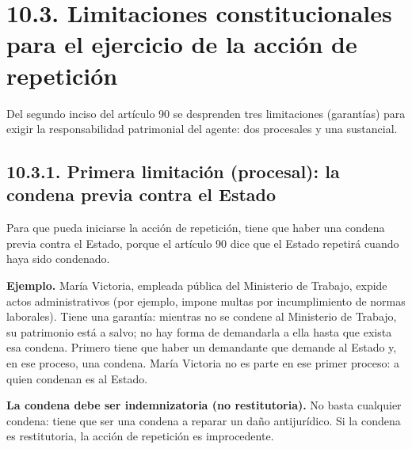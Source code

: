 \section{10.3. Limitaciones constitucionales para el ejercicio de la acción de repetición}
Del segundo inciso del artículo 90 se desprenden tres limitaciones (garantías) para exigir la responsabilidad patrimonial del agente: dos procesales y una sustancial.

\subsection{10.3.1. Primera limitación (procesal): la condena previa contra el Estado}
Para que pueda iniciarse la acción de repetición, tiene que haber una condena previa contra el Estado, porque el artículo 90 dice que el Estado repetirá cuando haya sido condenado.

\begin{ejemplo}
\textcolor[HTML]{4F6228}{\textbf{Ejemplo. }}María Victoria, empleada pública del Ministerio de Trabajo, expide actos administrativos (por ejemplo, impone multas por incumplimiento de normas laborales). Tiene una garantía: mientras no se condene al Ministerio de Trabajo, su patrimonio está a salvo; no hay forma de demandarla a ella hasta que exista esa condena. Primero tiene que haber un demandante que demande al Estado y, en ese proceso, una condena. María Victoria no es parte en ese primer proceso: a quien condenan es al Estado.
\end{ejemplo}
\textbf{La condena debe ser indemnizatoria (no restitutoria).} No basta cualquier condena: tiene que ser una condena a reparar un daño antijurídico. Si la condena es restitutoria, la acción de repetición es improcedente.

